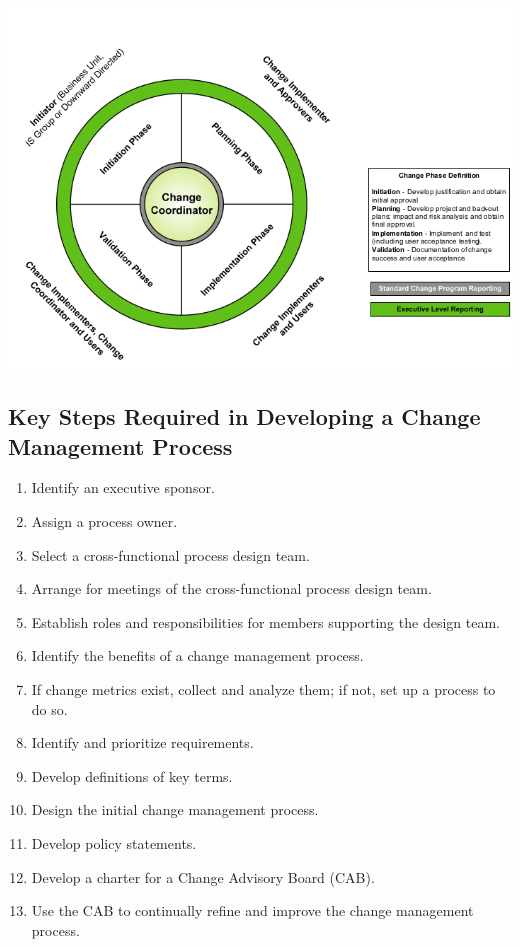 \documentclass[a4]{article}
\begin{document}
\begin{multicols}{3}
\begin{center}
    \begin{minipage}{\columnwidth}
        \includegraphics[width=\columnwidth]{change-coordinator.png}
    \end{minipage}
\end{center}

\subsection{Key Steps Required in Developing a Change Management Process}
\begin{enumerate}
\item Identify an executive sponsor.
\item Assign a process owner.
\item Select a cross-functional process design team.
\item Arrange for meetings of the cross-functional process design team.
\item Establish roles and responsibilities for members supporting the design team.
\item Identify the benefits of a change management process.
\item If change metrics exist, collect and analyze them; if not, set up a process to do so.
\item Identify and prioritize requirements.
\item Develop definitions of key terms.
\item Design the initial change management process.
\item Develop policy statements.
\item Develop a charter for a Change Advisory Board (CAB).
\item Use the CAB to continually refine and improve the change management process.
\end{enumerate}


\end{multicols}
\end{document}
